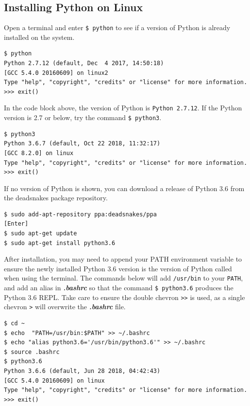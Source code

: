 \documentclass{book}
\begin{document}
    
        \subsection{Installing Python on
Linux}\label{installing-python-on-linux}

Open a terminal and enter \lstinline!$ python! to see if a version of
Python is already installed on the system.

\begin{lstlisting}
$ python
Python 2.7.12 (default, Dec  4 2017, 14:50:18)
[GCC 5.4.0 20160609] on linux2
Type "help", "copyright", "credits" or "license" for more information.
>>> exit()
\end{lstlisting}

In the code block above, the version of Python is
\lstinline!Python 2.7.12!. If the Python version is 2.7 or below, try
the command \lstinline!$ python3!.

\begin{lstlisting}
$ python3
Python 3.6.7 (default, Oct 22 2018, 11:32:17) 
[GCC 8.2.0] on linux
Type "help", "copyright", "credits" or "license" for more information.
>>> exit()
\end{lstlisting}

If no version of Python is shown, you can download a release of Python
3.6 from the deadsnakes package repository.

\begin{lstlisting}
$ sudo add-apt-repository ppa:deadsnakes/ppa
[Enter]
$ sudo apt-get update
$ sudo apt-get install python3.6
\end{lstlisting}

After installation, you may need to append your PATH environment
variable to ensure the newly installed Python 3.6 version is the version
of Python called when using the terminal. The commands below will add
\lstinline!/usr/bin! to your \lstinline!PATH!, and add an alias in
\textbf{\emph{.bashrc}} so that the command \lstinline!$ python3.6!
produces the Python 3.6 REPL. Take care to ensure the double chevron
\lstinline!>>! is used, as a single chevron \lstinline!>! will overwrite
the \textbf{\emph{.bashrc}} file.

\begin{lstlisting}
$ cd ~
$ echo  "PATH=/usr/bin:$PATH" >> ~/.bashrc 
$ echo "alias python3.6='/usr/bin/python3.6'" >> ~/.bashrc
$ source .bashrc
$ python3.6
Python 3.6.6 (default, Jun 28 2018, 04:42:43)
[GCC 5.4.0 20160609] on linux
Type "help", "copyright", "credits" or "license" for more information.
>>> exit()
\end{lstlisting}
    
\end{document}
